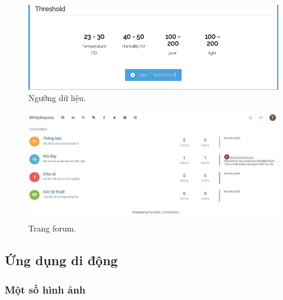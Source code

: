 \documentclass[a4paper,12pt,oneside]{article}
\begin{document}
\begin{center}
\begin{figure}[H]
\begin{center}
\includegraphics[scale=.5]{hinh/web_threshold.png}
\end{center}
\caption{Ngưỡng dữ liệu.}
\end{figure}

\begin{figure}[H]
\begin{center}
\includegraphics[scale=.5]{hinh/web_forum.jpg}
\end{center}
\caption{Trang forum.}
\end{figure}



\end{center}

\subsection{Ứng dụng di động}
\subsubsection{Một số hình ảnh}
\end{document}
